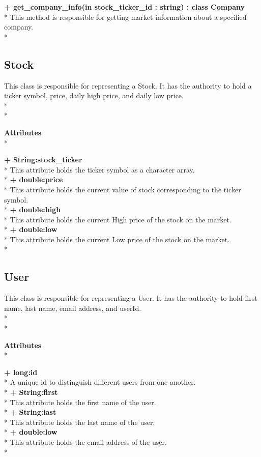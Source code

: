 {\bfseries + get_company_info(in stock_ticker_id : string) : class Company } \\*
	This method is responsible for getting market information about a
    specified company.  \\*

\subsection{Stock}
This class is responsible for representing a Stock. It has the authority to hold
a ticker symbol, price, daily high price, and daily low price. \\* \\*

{\bfseries Attributes} \\*

{\bfseries + String:stock_ticker} \\*
This attribute holds the ticker symbol as a character array.\\*
{\bfseries + double:price} \\*
This attribute holds the current value of stock corresponding to the ticker
symbol.\\*
{\bfseries + double:high} \\*
This attribute holds the current High price of the stock on the market.\\*
{\bfseries + double:low} \\*
This attribute holds the current Low price of the stock on the market.\\*

\subsection{User}
This class is responsible for representing a User. It has the authority to hold
first name, last name, email address, and userId.\\* \\*

{\bfseries Attributes} \\*

{\bfseries + long:id} \\*
A unique id to distinguish different users from one another. \\*
{\bfseries + String:first} \\*
This attribute holds the first name of the user. \\*
{\bfseries + String:last} \\*
This attribute holds the last name of the user. \\*
{\bfseries + double:low} \\*
This attribute holds the email address of the user. \\*


